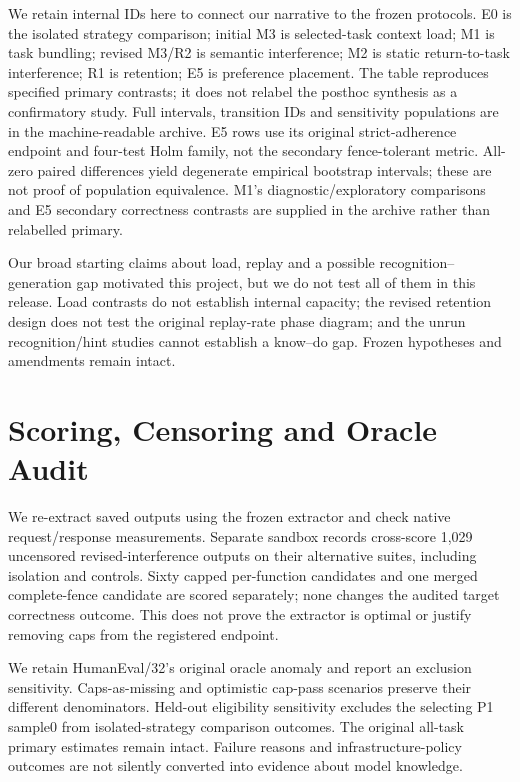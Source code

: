 \documentclass[10pt,a4paper,twocolumn]{article}
\begin{document}
We retain internal IDs here to connect our narrative to the frozen protocols.
E0 is the isolated strategy comparison; initial M3 is selected-task context
load; M1 is task bundling; revised M3/R2 is semantic interference; M2 is static
return-to-task interference; R1 is retention; E5 is preference placement.
The table reproduces specified primary contrasts; it does not relabel the
posthoc synthesis as a confirmatory study. Full intervals, transition IDs and
sensitivity populations are in the machine-readable archive.
E5 rows use its original strict-adherence endpoint and four-test Holm family,
not the secondary fence-tolerant metric. All-zero paired differences yield
degenerate empirical bootstrap intervals; these are not proof of population
equivalence. M1's diagnostic/exploratory comparisons and E5 secondary
correctness contrasts are supplied in the archive rather than relabelled primary.
\small\normalsize

Our broad starting claims about load, replay and a possible recognition--generation
gap motivated this project, but we do not test all of them in this release. Load contrasts
do not establish internal capacity; the revised retention design does not test
the original replay-rate phase diagram; and the unrun recognition/hint studies
cannot establish a know--do gap. Frozen hypotheses and amendments remain intact.

\section{Scoring, Censoring and Oracle Audit}
We re-extract saved outputs using the frozen extractor and check native
request/response measurements. Separate sandbox records cross-score 1,029
uncensored revised-interference outputs on their alternative suites, including
isolation and controls. Sixty capped per-function candidates and one merged
complete-fence candidate are scored separately; none changes the audited target
correctness outcome. This does not prove the extractor is optimal or justify
removing caps from the registered endpoint.

We retain HumanEval/32's original oracle anomaly and report an exclusion
sensitivity. Caps-as-missing and optimistic cap-pass scenarios preserve their
different denominators. Held-out eligibility sensitivity excludes the selecting
P1 sample0 from isolated-strategy comparison outcomes. The original all-task
primary estimates remain intact. Failure reasons and infrastructure-policy
outcomes are not silently converted into evidence about model knowledge.
\end{document}
